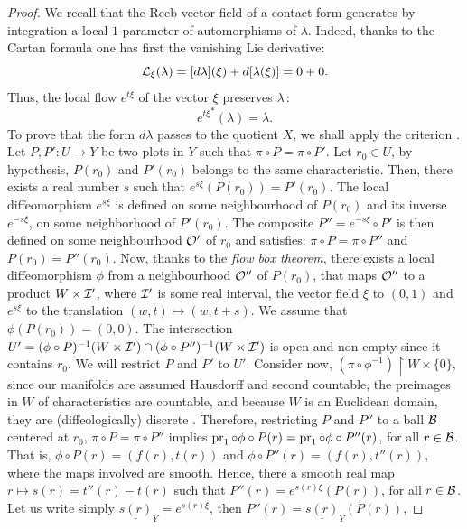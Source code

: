 \begin{proof}
  We recall that the Reeb vector field of a contact form generates by integration a local $1$-parameter of automorphisms of $\lambda$.
  Indeed,
  thanks to the Cartan formula one has first the vanishing Lie derivative:
  $$
    \mathcal{L}_\xi(\lambda) = [d\lambda](\xi) + d[\lambda(\xi)] = 0 + 0.
    $$
  Thus,
  the local flow $e^{t\xi}$ of the vector $\xi$ preserves $\lambda$\,:
  $$
    {e^{t\xi}}^*(\lambda) = \lambda.
    $$
  To prove that the form $d\lambda$ passes to the quotient $X$,
  we shall apply the criterion \cite[]{PIZ13}.
  Let $P,P' \colon U \to Y$ be two plots in $Y$ such that $\pi \circ P = \pi \circ P'$.
  Let $r_0 \in U$,
  by hypothesis,
  $P(r_0)$ and $P'(r_0)$ belongs to the same characteristic.
  Then,
  there exists a real number $s$ such that $e^{s\xi}(P(r_0)) = P'(r_0)$.
  The local diffeomorphism $e^{s\xi}$ is defined on some neighbourhood of $P(r_0)$ and its inverse $e^{-s\xi}$,
  on some neighborhood of $P'(r_0)$.
  The composite $P'' = e^{-s\xi} \circ P'$ is then defined on some neighbourhood $\mathcal{O}'$ of $r_0$ and satisfies:
  $\pi \circ P = \pi \circ P''$ and $P(r_0) = P''(r_0)$.
  Now,
  thanks to the \emph{flow box theorem},
  there exists a local diffeomorphism $\phi$ from a neighbourhood $\mathcal{O}''$ of $P(r_0)$,
  that maps $\mathcal{O}''$ to a product $W \times \mathcal{I}'$,
  where $\mathcal{I}'$ is some real interval,
  the vector field $\xi$ to $(0,1)$ and $e^{s\xi}$ to the translation $(w,t) \mapsto (w,t+s)$.
  We assume that $\phi(P(r_0)) = (0,0)$.
  The intersection $U' = (\phi \circ P)^{-1}(W \times \mathcal{I}') \cap (\phi \circ P'')^{-1}(W \times \mathcal{I}')$ is open and non empty since it contains $r_0$.
  We will restrict $P$ and $P'$ to $U'$.
  Consider now,
  $(\pi \circ \phi^{-1}) \restriction W \times \{0\}$,
  since our manifolds are assumed Hausdorff and second countable,
  the preimages in $W$ of characteristics are countable,
  and because $W$ is an Euclidean domain,
  they are (diffeologically) discrete \cite[Exercice 8]{PIZ13}.
  Therefore,
  restricting $P$ and $P''$ to a ball $\mathcal{B}$ centered at $r_0$,
  $\pi \circ P = \pi \circ P''$ implies $\operatorname{pr}_1 \circ \phi \circ P(r) = \operatorname{pr}_1 \circ \phi \circ P''(r)$,
  for all $r \in \mathcal{B}$.
  That is,
  $\phi \circ P(r) = (f(r), t(r))$ and $\phi \circ P''(r) = (f(r), t''(r))$,
  where the maps involved are smooth.
  Hence,
  there a smooth real map $r \mapsto s(r) = t''(r) - t(r)$ such that $P''(r) = e^{s(r)\xi}(P(r))$,
  for all $r \in \mathcal{B}$.
  Let us write simply $\underline{s(r)}_Y = e^{s(r)\xi}$,
  then $P''(r) = \underline{s(r)}_Y(P(r))$,

\end{proof}
